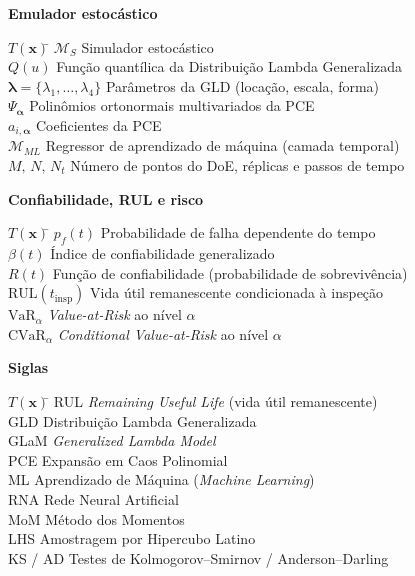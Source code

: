 \noindent\textbf{Emulador estocástico}
\begin{tabbing}
$T(\mathbf{x})$\qquad\qquad \= \kill
$\mathcal{M}_S$ \> Simulador estocástico \\
$Q(u)$        \> Função quantílica da Distribui\c{c}\~ao Lambda Generalizada \\
$\boldsymbol{\lambda}=\{\lambda_1,\dots,\lambda_4\}$ \> Par\^ametros da GLD (loca\c{c}\~ao, escala, forma) \\
$\Psi_{\boldsymbol{\alpha}}$ \> Polin\^omios ortonormais multivariados da PCE \\
$a_{i,\boldsymbol{\alpha}}$ \> Coeficientes da PCE \\
$\mathcal{M}_{ML}$ \> Regressor de aprendizado de máquina (camada temporal) \\
$M,\,N,\,N_t$ \> Número de pontos do DoE, réplicas e passos de tempo
\end{tabbing}

\noindent\textbf{Confiabilidade, RUL e risco}
\begin{tabbing}
$T(\mathbf{x})$\qquad\qquad \= \kill
$p_f(t)$      \> Probabilidade de falha dependente do tempo \\
$\beta(t)$    \> Índice de confiabilidade generalizado \\
$R(t)$        \> Função de confiabilidade (probabilidade de sobrevivência) \\
$\mathrm{RUL}(t_{\mathrm{insp}})$ \> Vida útil remanescente condicionada \`a inspeção \\
$\mathrm{VaR}_\alpha$ \> \textit{Value-at-Risk} ao nível $\alpha$ \\
$\mathrm{CVaR}_\alpha$ \> \textit{Conditional Value-at-Risk} ao nível $\alpha$
\end{tabbing}

\noindent\textbf{Siglas}
\begin{tabbing}
$T(\mathbf{x})$\qquad\qquad \= \kill
RUL \> \textit{Remaining Useful Life} (vida útil remanescente) \\
GLD \> Distribui\c{c}\~ao Lambda Generalizada \\
GLaM \> \textit{Generalized Lambda Model} \\
PCE \> Expansão em Caos Polinomial \\
ML \> Aprendizado de Máquina (\textit{Machine Learning}) \\
RNA \> Rede Neural Artificial \\
MoM \> M\'etodo dos Momentos \\
LHS \> Amostragem por Hipercubo Latino \\
KS / AD \> Testes de Kolmogorov--Smirnov / Anderson--Darling
\end{tabbing}
